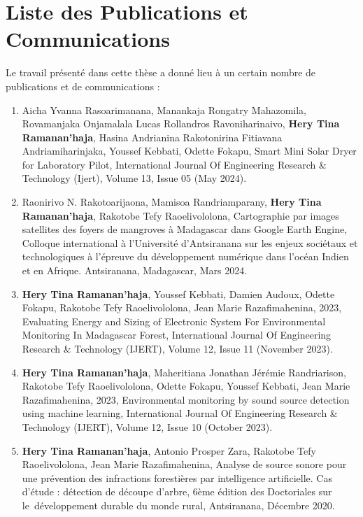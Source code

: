 \chapter*{Liste des Publications et Communications}
{}

Le travail présenté dans cette thèse a donné lieu à un certain nombre de publications et de communications :

\begin{enumerate}
\item	Aicha Yvanna Rasoarimanana, Manankaja Rongatry Mahazomila, Rovamanjaka Onjamalala Lucas Rollandros Ravoniharinaivo, \textbf{Hery Tina Ramanan’haja}, Hasina Andrianina Rakotonirina Fitiavana Andriamiharinjaka, Youssef Kebbati, Odette Fokapu, Smart Mini Solar Dryer for Laboratory Pilot, International Journal Of Engineering Research \& Technology (Ijert), Volume 13, Issue 05 (May 2024).\\
	
	\item 	Raonirivo N. Rakotoarijaona, Mamisoa Randriamparany, \textbf{Hery Tina Ramanan’haja}, Rakotobe Tefy Raoelivololona, Cartographie par images satellites des foyers de mangroves à Madagascar dans Google Earth Engine, Colloque international à l’Université d’Antsiranana sur les enjeux sociétaux et technologiques à l’épreuve du développement numérique dans l'océan Indien et en Afrique. Antsiranana, Madagascar, Mars 2024.\\
	
\item	\textbf{Hery Tina Ramanan’haja}, Youssef Kebbati, Damien Audoux, Odette Fokapu, Rakotobe Tefy Raoelivololona, Jean Marie Razafimahenina, 2023, Evaluating Energy and Sizing of Electronic System For Environmental Monitoring In Madagascar Forest, International Journal Of Engineering Research \& Technology (IJERT), Volume 12, Issue 11 (November 2023).\\
	
\item	\textbf{Hery Tina Ramanan’haja}, Maheritiana Jonathan Jérémie Randriarison, Rakotobe Tefy Raoelivololona, Odette Fokapu, Youssef Kebbati, Jean Marie Razafimahenina, 2023, Environmental monitoring by sound source detection using machine learning, International Journal Of Engineering Research \& Technology (IJERT), Volume 12, Issue 10 (October 2023).\\
	
\item	\textbf{Hery Tina Ramanan’haja}, Antonio Prosper Zara, Rakotobe Tefy Raoelivololona, Jean Marie Razafimahenina, Analyse de source sonore pour une prévention des infractions forestières par intelligence artificielle. Cas d’étude : détection de découpe d’arbre, 6ème édition des Doctoriales sur le développement durable du monde rural, Antsiranana, Décembre 2020.\\
	

\end{enumerate}
